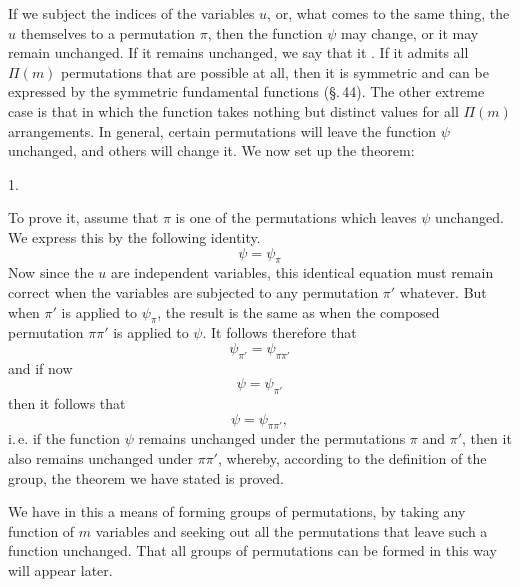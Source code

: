 If we subject the indices of the variables $u$, or, what comes to the same thing, the $u$ themselves to a permutation $\pi$, then the function $\psi$ may change, or it may remain unchanged. If it remains unchanged, we say that it . If it admits all $\Pi(m)$ permutations that are possible at all, then it is symmetric and can be expressed by the symmetric fundamental functions (\S.\,44). The other extreme case is that in which the function takes nothing but distinct values for all $\Pi(m)$ arrangements. In general, certain permutations will leave the function $\psi$ unchanged, and others will change it. We now set up the theorem:

1. 

To prove it, assume that $\pi$ is one of the permutations which leaves $\psi$ unchanged. We express this by the following identity.
\[
\psi = \psi_\pi
\]
Now since the $u$ are independent variables, this identical equation must remain correct when the variables are subjected to any permutation $\pi'$ whatever. But when $\pi'$ is applied to $\psi_\pi$, the result is the same as when the composed permutation $\pi\pi'$ is applied to $\psi$. It follows therefore that
\[
\psi_{\pi'} = \psi_{\pi\pi'}
\]
and if now
\[
\psi = \psi_{\pi'}
\]
then it follows that
\[
\psi = \psi_{\pi\pi'},
\]
i.\,e. if the function $\psi$ remains unchanged under the permutations $\pi$ and $\pi'$, then it also remains unchanged under $\pi\pi'$, whereby, according to the definition of the group, the theorem we have stated is proved.

We have in this a means of forming groups of permutations, by taking any function of $m$ variables and seeking out all the permutations that leave such a function unchanged. That all groups of permutations can be formed in this way will appear later.
